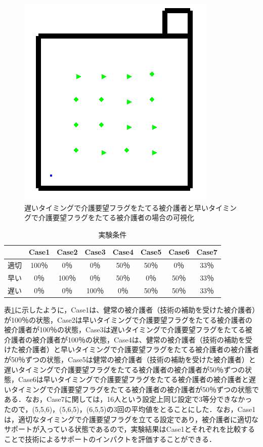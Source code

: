 \begin{figure}[htb]
\begin{center}
 \includegraphics[scale=0.5]{figures/dementia_urinate_v1.png}
 \caption[遅いタイミングで介護要望フラグをたてる被介護者と早いタイミングで介護要望フラグをたてる被介護者の場合の可視化]{遅いタイミングで介護要望フラグをたてる被介護者と早いタイミングで介護要望フラグをたてる被介護者の場合の可視化 \label{dementia_urinate_v1}}
\end{center}
\end{figure}

\begin{table}[htb]
  \caption[実験条件]{実験条件}
  \label{experiment}
  \centering
  \begin{tabular}{r|c|c|c|c|c|c|c}
     & Case1 & Case2 & Case3 & Case4 & Case5 & Case6 & Case7 \\ \hline
    適切 & 100％ & 0％ & 0％ & 50％ & 50％ & 0％ & 33％ \\
    早い & 0％ & 100％ & 0％ & 50％ & 0％ & 50％ & 33％ \\
    遅い & 0％ & 0％ & 100％ & 0％ & 50％ & 50％ & 33％ \\
    \end{tabular}
\end{table}

表\ref{experiment}に示したように，Case1は、健常の被介護者（技術の補助を受けた被介護者）が100％の状態，Case2は早いタイミングで介護要望フラグをたてる被介護者の被介護者が100％の状態，Case3は遅いタイミングで介護要望フラグをたてる被介護者の被介護者が100％の状態，Case4は、健常の被介護者（技術の補助を受けた被介護者）と早いタイミングで介護要望フラグをたてる被介護者の被介護者が50％ずつの状態，Case5は健常の被介護者（技術の補助を受けた被介護者）と遅いタイミングで介護要望フラグをたてる被介護者の被介護者が50％ずつの状態，Case6は早いタイミングで介護要望フラグをたてる被介護者の被介護者と遅いタイミングで介護要望フラグをたてる被介護者の被介護者が50％ずつの状態である．なお，Case7に関しては，16人という設定上同じ設定で3等分できなかったので，(5,5,6)，(5,6,5)，(6,5,5)の3回の平均値をとることにした．なお，Case1は，適切なタイミングで介護要望フラグを立てる設定であり，被介護者に適切なサポートが入っている状態であるので，実験結果はCase1とそれぞれを比較することで技術によるサポートのインパクトを評価することができる．


